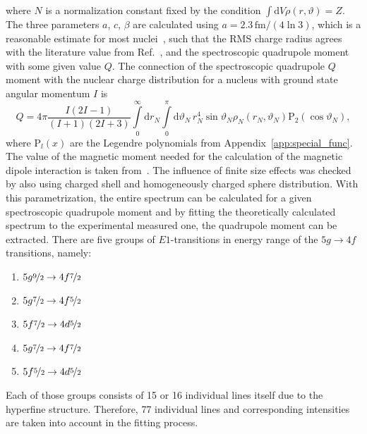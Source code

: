 where $N$ is a normalization constant fixed by the condition $\int\text{d}V \rho(r,\vartheta) = Z$.
The three parameters $a$, $c$, $\beta$ are calculated using $a=2.3\,\text{fm}/(4\ln3)$, which is a reasonable estimate for most nuclei~\cite{Beier2000}, such that the RMS charge radius agrees with the literature value from Ref.~\cite{Angeli2013}, and the spectroscopic quadrupole moment with some given value $Q$. The connection of the spectroscopic quadrupole $Q$ moment with the nuclear charge distribution for a nucleus with ground state angular momentum $I$ is
\begin{equation}
Q = 4\pi\frac{I(2I-1)}{(I+1)(2I+3)}\int\limits_0^\infty\text{d}r_N \int\limits_0^\pi\text{d}\vartheta_N\,
r_N^4 \sin\vartheta_N \rho_N(r_N,\vartheta_N)\text{P}_2(\cos\vartheta_N),
\end{equation}
where $\text{P}_l(x)$ are the Legendre polynomials from Appendix~\ref{app:special_func}.
The value of the magnetic moment needed for the calculation of the magnetic dipole interaction is taken from~\cite{STONE2016}. The influence of finite size effects was checked by also using charged shell and homogeneously charged sphere distribution.
With this parametrization, the entire spectrum can be calculated for a given spectroscopic quadrupole moment and by fitting the theoretically calculated spectrum to the experimental measured one, the quadrupole moment can be extracted. There are five groups of $E1$-transitions in energy range of the $5g\rightarrow 4f$ transitions, namely:
\begin{enumerate}
\item $5g\nicefrac{9}{2}\rightarrow 4f\nicefrac{7}{2}$
\item $5g\nicefrac{7}{2}\rightarrow 4f\nicefrac{5}{2}$
\item $5f\nicefrac{7}{2}\rightarrow 4d\nicefrac{5}{2}$
\item $5g\nicefrac{7}{2}\rightarrow 4f\nicefrac{7}{2}$
\item $5f\nicefrac{5}{2}\rightarrow 4d\nicefrac{5}{2}$
\end{enumerate} 
Each of those groups consists of 15 or 16 individual lines itself due to the hyperfine structure. Therefore, 77 individual lines and corresponding intensities are taken into account in the fitting process.

